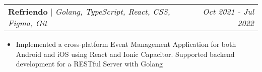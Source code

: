 \documentclass[letterpaper]{article}
\makeatletter
\newcommand{\resumeItemWithoutTitle}[1]{
  \item{
    {#1 \vspace{-4pt}}
  }
}
\newcommand{\projectHeading}[4]{
  \begin{tabular*}{\textwidth}{l@{\extracolsep{\fill}}r}
        \textbf{#1} 
        \hspace{-2pt} $\vert$ \hspace{-2pt} {\textit{#2}} 
        \hspace{-2pt} $\vert$ \hspace{-2pt} \href{#3}{ \underline{Link}}
        &
        \textit{#4} \\
    \end{tabular*}\vspace{-2pt}
}
\newcommand{\projectHeadingWithoutLink}[3]{
  \begin{tabular*}{\textwidth}{l@{\extracolsep{\fill}}r}
        \textbf{#1} 
        \hspace{-2pt} $\vert$ \hspace{-2pt} {\textit{#2}}
        & 
        \textit{#3} \\
    \end{tabular*}\vspace{-2pt}
}
\newcommand{\resumeItemListStart}{\begin{itemize}}
\newcommand{\resumeItemListEnd}{\end{itemize}}
\makeatother
\begin{document}



\vspace{3pt}
\projectHeadingWithoutLink{Refriendo}{Golang, TypeScript, React, CSS, Figma, Git}{Oct 2021 - Jul 2022}
\resumeItemListStart
\resumeItemWithoutTitle{Implemented a cross-platform Event Management Application for both Android and iOS using React and Ionic Capacitor. Supported backend development for a RESTful Server with Golang}
\resumeItemListEnd




\end{document}
